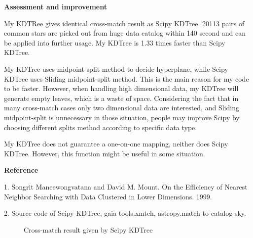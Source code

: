 \documentclass{article}
\begin{document}
\vspace{12pt}
\textbf{Assessment and improvement}\par
\vspace{12pt}
    My KDTRee gives identical cross-match result as Scipy KDTree. 20113 pairs of common stars are picked out from huge data catalog within 140 second and can be applied into further usage. My KDTree is 1.33 times faster than Scipy KDTree.\par
	My KDTree uses midpoint-split method to decide hyperplane, while Scipy KDTree uses Sliding midpoint-split method. This is the main reason for my code to be faster. However, when handling high dimensional data, my KDTree will generate empty leaves, which is a waste of space. Considering the fact that in many cross-match cases only two dimensional data are interested, and Sliding midpoint-split is unnecessary in those situation, people may improve Scipy by choosing different splits method according to specific data type.\par
	My KDTree does not guarantee a one-on-one mapping, neither does Scipy KDTree. However, this function might be useful in some situation.\par

\vspace{12pt}
\textbf{Reference}\par
\vspace{12pt}
	1. Songrit Maneewongvatana and David M. Mount. On the Efficiency of Nearest Neighbor Searching with Data Clustered in Lower Dimensions. 1999. \par
	2. Source code of Scipy KDTree, gaia tools.xmtch, astropy.match to catalog sky.\par 

	\begin{figure}[H]
		\centering
		\caption{Cross-match result given by Scipy KDTree}
	\end{figure}
	
\end{document}
